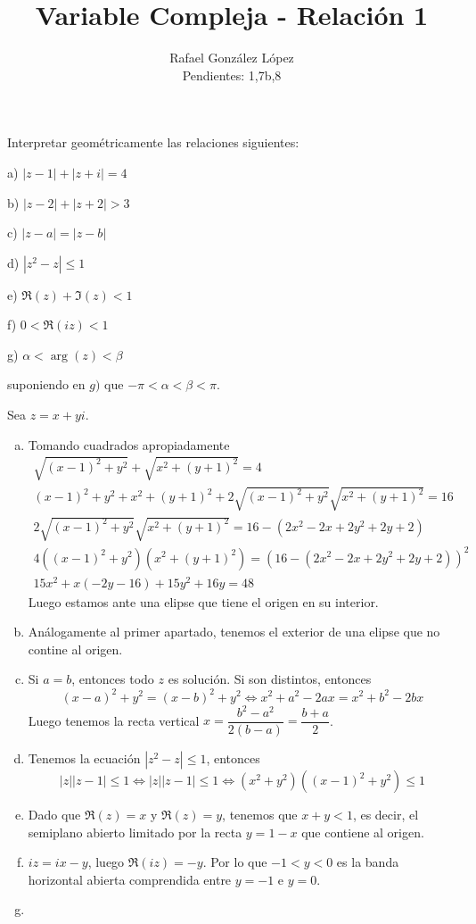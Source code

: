 \documentclass[twoside]{article}
\begin{document}
\title{Variable Compleja - Relación 1}
\author{Rafael González López\\
Pendientes: 1,7b,8}
\maketitle

\begin{ejercicio}{1}
Interpretar geométricamente las relaciones siguientes:
  \begin{AutoMultiColItemize}
  \item[a)] $|z-1|+|z+i|=4$
  \item[b)] $|z-2|+|z+2|>3$
  \item[c)] $|z-a|=|z-b|$
  \item[d)] $|z^2-z|\leq 1$
  \item[e)] $\Re(z)+\Im(z)<1$
  \item[f)] $0<\Re(iz)<1$
  \item[g)] $\alpha < \arg(z) < \beta$
  \end{AutoMultiColItemize}
suponiendo en $g)$ que $-\pi<\alpha<\beta<\pi$. 
\end{ejercicio}
\begin{solucion}
Sea $z=x+yi$. 
\begin{enumerate}[a)]
\item Tomando cuadrados apropiadamente
\begin{gather*}
\sqrt{(x-1)^2+y^2}+\sqrt{x^2+(y+1)^2}=4\\
(x-1)^2+y^2 + x^2+(y+1)^2 + 2\sqrt{(x-1)^2+y^2}\sqrt{x^2+(y+1)^2} = 16\\
2\sqrt{(x-1)^2+y^2}\sqrt{x^2+(y+1)^2} = 16 - (2 x^2 - 2 x + 2 y^2 + 2 y + 2)\\
4((x-1)^2+y^2)(x^2+(y+1)^2) = (16 - (2 x^2 - 2 x + 2 y^2 + 2 y + 2))^2\\
15 x^2 + x (-2 y - 16) + 15 y^2 + 16 y = 48	
\end{gather*}
Luego estamos ante una elipse que tiene el origen en su interior.
\item Análogamente al primer apartado, tenemos el exterior de una elipse que no contine al origen.
\item Si $a=b$, entonces todo $z$ es solución. Si son distintos, entonces
$$
(x-a)^2+y^2 = (x-b)^2 +y^2  \Leftrightarrow x^2+a^2-2ax = x^2+b^2 -2bx 
$$
Luego tenemos la recta vertical $x = \dfrac{b^2-a^2}{2(b-a)}=\dfrac{b+a}{2}$.
\item Tenemos la ecuación $|z^2-z|\leq 1$, entonces
$$
|z||z-1|\leq 1 \Leftrightarrow |z||z-1| \leq 1 \Leftrightarrow (x^2+y^2)((x-1)^2+y^2) \leq 1
$$
\item Dado que $\Re(z)=x$ y $\Re(z)=y$, tenemos que $x+y<1$, es decir, el semiplano abierto limitado por la recta $y=1-x$ que contiene al origen.
\item $iz= ix-y$, luego $\Re(iz)= -y$. Por lo que $-1<y<0$ es la banda horizontal abierta comprendida entre $y=-1$ e $y=0$.
\item 
\end{enumerate}
\end{solucion}
\end{document}
